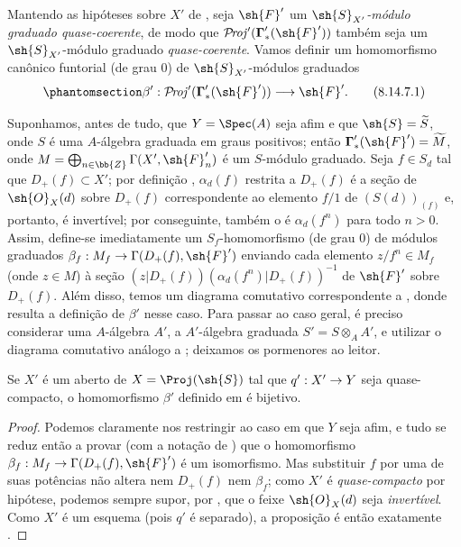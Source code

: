 \documentclass[oneside,10pt]{amsart}
\makeatletter
\newcommand{\ega@arrow}[2]{\mathchoice{#1}{#2}{#2}{#2}}
\renewcommand{\to}{\ega@arrow{\longrightarrow}{\rightarrow}}
\def\shProj{\mathcal{P}\!\mathit{roj}}
\newcommand{\oldpage}[2][]{\marginnote{\normalfont\footnotesize\textbf{#1}~|~#2}\ignorespaces}
\let\EGAOriginalLabel\label
\renewcommand{\label}[1]{\phantomsection\EGAOriginalLabel{#1}}
\makeatother
\begin{document}
\begin{env}[8.14.7]
\label{II.8.14.7}
Mantendo as hipóteses sobre $X'$ de , seja $\sh{F}'$ um \emph{$\sh{S}_{X'}$-módulo graduado quase-coerente}, de modo que $\shProj'(\boldsymbol{\Gamma}'_*(\sh{F}'))$ também seja um $\sh{S}_{X'}$-módulo graduado \emph{quase-coerente}.
\oldpage[II]{200}
Vamos definir um homomorfismo canônico funtorial (de grau $0$) de $\sh{S}_{X'}$-módulos graduados
\[
\label{II.8.14.7.1}
    \beta': \shProj'(\boldsymbol{\Gamma}'_*(\sh{F}')) \to \sh{F}'.
\tag{8.14.7.1}
\]

Suponhamos, antes de tudo, que $Y=\Spec(A)$ seja afim e que $\sh{S}=\widetilde{S}$, onde $S$ é uma $A$-álgebra graduada em graus positivos;
então $\boldsymbol{\Gamma}'_*(\sh{F}')=\widetilde{M}$, onde $M=\bigoplus_{n\in\bb{Z}}\Gamma(X',\sh{F}'_n)$ é um $S$-módulo graduado.
Seja $f\in S_d$ tal que $D_+(f)\subset X'$;
por definição , $\alpha_d(f)$ restrita a $D_+(f)$ é a seção de $\sh{O}_X(d)$ sobre $D_+(f)$ correspondente ao elemento $f/1$ de $(S(d))_{(f)}$ e, portanto, é invertível;
por conseguinte, também o é $\alpha_d(f^n)$ para todo $n>0$.
Assim, define-se imediatamente um $S_f$-homomorfismo (de grau $0$) de módulos graduados $\beta_f:M_f\to\Gamma(D_+(f),\sh{F}')$ enviando cada elemento $z/f^n\in M_f$ (onde $z\in M$) à seção $(z|D_+(f))(\alpha_d(f^n)|D_+(f))^{-1}$ de $\sh{F}'$ sobre $D_+(f)$.
Além disso, temos um diagrama comutativo correspondente a , donde resulta a definição de $\beta'$ nesse caso.
Para passar ao caso geral, é preciso considerar uma $A$-álgebra $A'$, a $A'$-álgebra graduada $S'=S\otimes_A A'$, e utilizar o diagrama comutativo análogo a ;
deixamos os pormenores ao leitor.
\end{env}

\begin{proposition}[8.14.8]
\label{II.8.14.8}
Se $X'$ é um aberto de $X=\Proj(\sh{S})$ tal que $q':X'\to Y$ seja quase-compacto, o homomorfismo $\beta'$ definido em  é bijetivo.
\end{proposition}

\begin{proof}
Podemos claramente nos restringir ao caso em que $Y$ seja afim, e tudo se reduz então a provar (com a notação de ) que o homomorfismo $\beta_f:M_f\to\Gamma(D_+(f),\sh{F}')$ é um isomorfismo.
Mas substituir $f$ por uma de suas potências não altera nem $D_+(f)$ nem $\beta_f$;
como $X'$ é \emph{quase-compacto} por hipótese, podemos sempre supor, por , que o feixe $\sh{O}_X(d)$ seja \emph{invertível}.
Como $X'$ é um esquema (pois $q'$ é separado), a proposição é então exatamente .
\end{proof}
\end{document}
